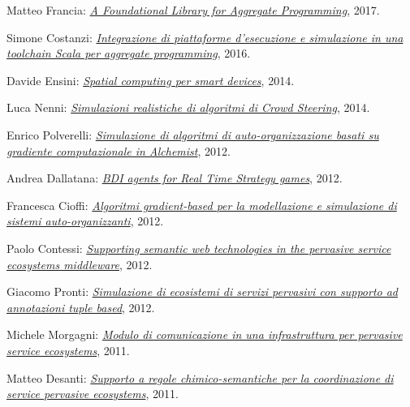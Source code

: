 \begin{innerlist}
    \item Matteo Francia: \href{http://amslaurea.unibo.it/13090/}{\textit{A Foundational Library for Aggregate Programming}}, 2017.
    \item Simone Costanzi: \href{http://amslaurea.unibo.it/10519/}{\textit{Integrazione di piattaforme d'esecuzione e simulazione in una toolchain Scala per aggregate programming}}, 2016.
    \item Davide Ensini: \href{http://amslaurea.unibo.it/7990/}{\textit{Spatial computing per smart devices}}, 2014.
    \item Luca Nenni: \href{http://amslaurea.unibo.it/6927/}{\textit{Simulazioni realistiche di algoritmi di Crowd Steering}}, 2014.
    \item Enrico Polverelli: \href{http://amslaurea.unibo.it/5293/}{\textit{Simulazione di algoritmi di auto-organizzazione basati su gradiente computazionale in Alchemist}}, 2012.
    \item Andrea Dallatana: \href{http://amslaurea.unibo.it/4217/}{\textit{BDI agents for Real Time Strategy games}}, 2012.
    \item Francesca Cioffi: \href{http://amslaurea.unibo.it/4088/}{\textit{Algoritmi gradient-based per la modellazione e simulazione di sistemi auto-organizzanti}}, 2012.
    \item Paolo Contessi: \href{http://amslaurea.unibo.it/4074/}{\textit{Supporting semantic web technologies in the pervasive service ecosystems middleware}}, 2012.
    \item Giacomo Pronti: \href{http://archive.fo/nBeOg}{\textit{Simulazione di ecosistemi di servizi pervasivi con supporto ad annotazioni tuple based}}, 2012.
    \item Michele Morgagni: \href{http://archive.fo/6mnSN}{\textit{Modulo di comunicazione in una infrastruttura per pervasive service ecosystems}}, 2011.
    \item Matteo Desanti: \href{http://archive.fo/rwla1}{\textit{Supporto a regole chimico-semantiche per la coordinazione di service pervasive ecosystems}}, 2011.
\end{innerlist}

